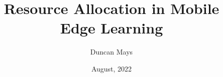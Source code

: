 \documentclass{article}
\begin{document}
\title{Resource Allocation in Mobile Edge Learning}
\author{Duncan Mays}
\date{August, 2022}

\maketitle


\end{document}
